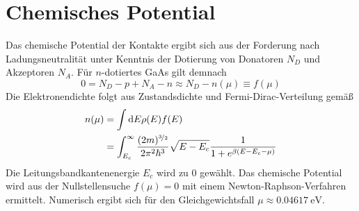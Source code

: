 \section{Chemisches Potential }
\label{sec:A_3}
Das chemische Potential der Kontakte ergibt sich aus der Forderung nach Ladungsneutralität unter Kenntnis der Dotierung von Donatoren $N_D$ und Akzeptoren $N_A$. Für $n$-dotiertes GaAs gilt demnach
\begin{equation}
  0 = N_D - p + N_A - n \approx N_D - n(\mu) \equiv f(\mu)
\end{equation}
Die Elektronendichte folgt aus Zustandsdichte und Fermi-Dirac-Verteilung gemäß
\begin{align}
  n(\mu) &= \int\mathop{}\!\mathrm{d} E \rho(E) f(E) \\
   &= \int_{E_c}^{\infty}\frac{(2m)^{\nicefrac{3}{2}} }{2\pi^2\hbar^3}\sqrt{E-E_c} \frac{1}{1+e^{\beta(E-E_c-\mu)}}
\end{align}
Die Leitungsbandkantenenergie $E_c$ wird zu 0 gewählt. Das chemische Potential wird aus der Nullstellensuche $f(\mu)=0$ mit einem Newton-Raphson-Verfahren ermittelt. Numerisch ergibt sich für den Gleichgewichtsfall  $\mu\approx\SI{0.04617}{\electronvolt}$.
